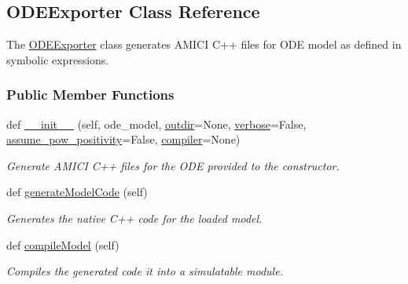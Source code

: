 \hypertarget{classamici_1_1ode__export_1_1_o_d_e_exporter}{}\subsection{O\+D\+E\+Exporter Class Reference}
\label{classamici_1_1ode__export_1_1_o_d_e_exporter}


The \mbox{\hyperlink{classamici_1_1ode__export_1_1_o_d_e_exporter}{O\+D\+E\+Exporter}} class generates A\+M\+I\+CI C++ files for O\+DE model as defined in symbolic expressions.  


\subsubsection*{Public Member Functions}
\begin{DoxyCompactItemize}
\item 
def \mbox{\hyperlink{classamici_1_1ode__export_1_1_o_d_e_exporter_aa0cb0b5f562816ee9e4f17ab38337227}{\+\_\+\+\_\+init\+\_\+\+\_\+}} (self, ode\+\_\+model, \mbox{\hyperlink{classamici_1_1ode__export_1_1_o_d_e_exporter_aac4f80ee02f9c658ec0633be070b1c1b}{outdir}}=None, \mbox{\hyperlink{classamici_1_1ode__export_1_1_o_d_e_exporter_aa9e289eddb591991c9bc7321dc5b186b}{verbose}}=False, \mbox{\hyperlink{classamici_1_1ode__export_1_1_o_d_e_exporter_a29c4626a170365ee3773218f11565690}{assume\+\_\+pow\+\_\+positivity}}=False, \mbox{\hyperlink{classamici_1_1ode__export_1_1_o_d_e_exporter_a3da8f16c6fe93b3b56fc83d5ceda9ead}{compiler}}=None)
\begin{DoxyCompactList}\small\item\em Generate A\+M\+I\+CI C++ files for the O\+DE provided to the constructor. \end{DoxyCompactList}\item 
def \mbox{\hyperlink{classamici_1_1ode__export_1_1_o_d_e_exporter_a3ec6677c764c1a2d57a51d8a9f468310}{generate\+Model\+Code}} (self)
\begin{DoxyCompactList}\small\item\em Generates the native C++ code for the loaded model. \end{DoxyCompactList}\item 
def \mbox{\hyperlink{classamici_1_1ode__export_1_1_o_d_e_exporter_a61bf03049b9989d73b584fbca9f8d499}{compile\+Model}} (self)
\begin{DoxyCompactList}\small\item\em Compiles the generated code it into a simulatable module. \end{DoxyCompactList}\item 

\end{DoxyCompactItemize}
